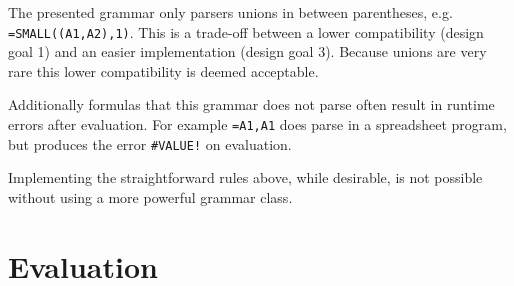 The presented grammar only parsers unions in between parentheses, e.g. \texttt{=SMALL((A1,A2),1)}.
This is a trade-off between a lower compatibility (design goal 1) and an easier implementation (design goal 3).
Because unions are very rare \cite{xlparser} this lower compatibility is deemed acceptable.

Additionally formulas that this grammar does not parse often result in runtime errors after evaluation.
For example \texttt{=A1,A1} does parse in a spreadsheet program, but produces the error \texttt{\#VALUE!} on evaluation.

Implementing the straightforward rules above, while desirable, is not possible without using a more powerful grammar class.

\section{Evaluation}
\label{sec:parserevaluation}

